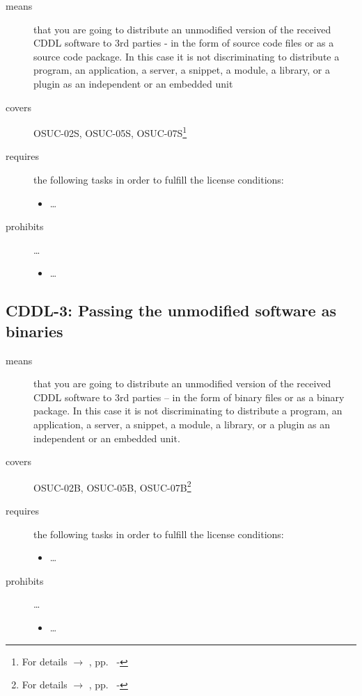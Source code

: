 \begin{description}

\item[means] that you are going to distribute an unmodified version of the
received CDDL software to 3rd parties - in the form of source code files or as a
source code package. In this case it is not discriminating to distribute a
program, an application, a server, a snippet, a module, a library, or a plugin
as an independent or an embedded unit

\item[covers] OSUC-02S, OSUC-05S, OSUC-07S\footnote{For details $\rightarrow$
\oslic, pp.\ \pageref{OSUC-02S-DEF} - \pageref{OSUC-07S-DEF}}

\item[requires] the following tasks in order to fulfill the license conditions:
\begin{itemize}
  
  \item \ldots
  
\end{itemize}

\item[prohibits] \ldots
\begin{itemize}
  \item \ldots
\end{itemize}
\end{description}


\subsection{CDDL-3: Passing the unmodified software as binaries} 
\label{OSUC-02B-CDDL} \label{OSUC-05B-CDDL} \label{OSUC-07B-CDDL}

\begin{description}
\item[means] that you are going to distribute an unmodified version of the
received CDDL software to 3rd parties -- in the form of binary files or as a
bi\-na\-ry package. In this case it is not discriminating to distribute a
program, an application, a server, a snippet, a module, a library, or a plugin
as an independent or an embedded unit.

\item[covers] OSUC-02B, OSUC-05B, OSUC-07B\footnote{For details $\rightarrow$
\oslic, pp.\ \pageref{OSUC-02B-DEF} - \pageref{OSUC-07B-DEF}}

\item[requires] the following tasks in order to fulfill the license conditions:
\begin{itemize}
  
  \item \ldots
  
\end{itemize}

\item[prohibits] \ldots
\begin{itemize}
  \item \ldots
\end{itemize}
\end{description}


